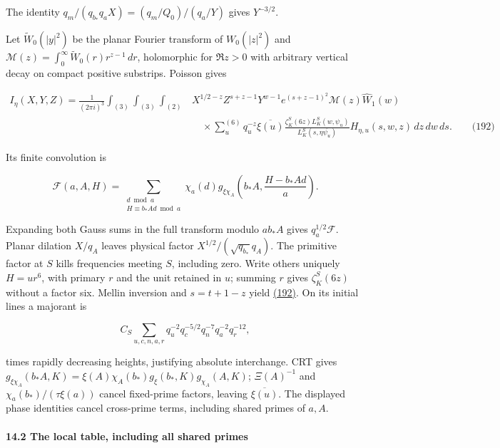 The identity \(q_m/(q_{b_*}q_aX)=(q_m/Q_0)/(q_a/Y)\) gives \(Y^{-3/2}\).

Let \(\widetilde W_0(|y|^2)\) be the planar Fourier transform of \(W_0(|z|^2)\) and \(\mathscr M(z)=\int_0^\infty\widetilde W_0(r)r^{z-1}\,dr\), holomorphic for \(\Re z>0\) with arbitrary vertical decay on compact positive substrips. Poisson gives

\hypertarget{dr:Poisson}{}

\label{dr:Poisson}

\[
\begin{aligned}
 I_\eta(X,Y,Z)=\frac1{(2\pi i)^3}
 \int_{(3)}\int_{(3)}\int_{(2)}
 &X^{1/2-z}Z^{s+z-1}Y^{w-1}e^{(s+z-1)^2}
 \mathscr M(z)\widehat W_1(w)\\[-2mm]
 &\quad\times\sum_u^{(6)}q_u^{-z}\overline{\xi(u)}
 \frac{\zeta_K^S(6z)L_K^S(w,\psi_u)}
 {L_K^S(s,\eta\overline{\psi_u})}H_{\eta,u}(s,w,z)
 \,dz\,dw\,ds.\qquad\text{(192)}
\end{aligned}
\]

Its finite convolution is

\[
\mathcal F(a,A,H)=\sum_{\substack{d\bmod a\\H\equiv b_*Ad\bmod a}}
 \chi_a(d)g_{\xi\chi_A}
 \left(b_*A,\frac{H-b_*Ad}{a}\right).
\]

Expanding both Gauss sums in the full transform modulo \(ab_*A\) gives \(q_a^{1/2}\mathcal F\). Planar dilation \(X/q_A\) leaves physical factor \(X^{1/2}/(\sqrt{q_{b_*}}q_A)\). The primitive factor at \(S\) kills frequencies meeting \(S\), including zero. Write others uniquely \(H=ur^6\), with primary \(r\) and the unit retained in \(u\); summing \(r\) gives \(\zeta_K^S(6z)\) without a factor six. Mellin inversion and \(s=t+1-z\) yield \protect\hyperlink{dr:Poisson}{(192)}. On its initial lines a majorant is

\[
C_S\sum_{u,c,n,a,r}q_u^{-2}q_c^{-5/2}q_n^{-7}q_a^{-2}q_r^{-12},
\]

times rapidly decreasing heights, justifying absolute interchange. CRT gives \(g_{\xi\chi_A}(b_*A,K)=\xi(A)\chi_A(b_*)g_\xi(b_*,K)g_{\chi_A}(A,K)\); \(\Xi(A)^{-1}\) and \(\chi_a(b_*)/(\tau\xi(a))\) cancel fixed-prime factors, leaving \(\overline{\xi(u)}\). The displayed phase identities cancel cross-prime terms, including shared primes of \(a,A\).

\hypertarget{dr:local}{}

\label{dr:local}

\hypertarget{the-local-table-including-all-shared-primes}{%
\paragraph{14.2 The local table, including all shared primes}\label{the-local-table-including-all-shared-primes}}

